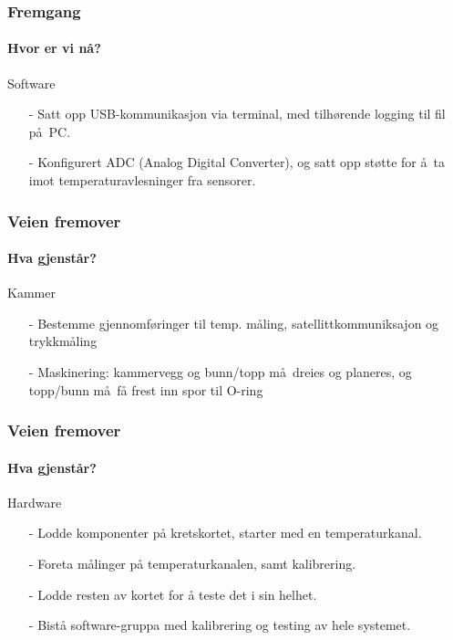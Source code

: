 \documentclass{beamer}
\begin{document}
    \begin{frame}
    	\frametitle{Fremgang}
    	\framesubtitle{Hvor er vi n\aa ?}
    	\begin{block}{Software}
    		\begin{itemize}
    			\item[-] Satt opp USB-kommunikasjon via terminal, med tilh\o rende logging til fil p\aa\ PC.
    			\item[-] Konfigurert ADC (Analog Digital Converter), og satt opp st\o tte for \aa\ ta imot temperaturavlesninger fra sensorer.
    		\end{itemize}
    	\end{block}
    \end{frame}

  \begin{frame}
    \frametitle{Veien fremover}
    \framesubtitle{Hva gjenst\aa r?}
        \begin{block}{Kammer}
    	\begin{itemize}
    		\item[-] Bestemme gjennomf\o ringer til temp. m\aa ling, satellittkommuniksajon og trykkm\aa ling
    		\item[-] Maskinering: kammervegg og bunn/topp m\aa\ dreies og planeres, og topp/bunn m\aa\ få frest inn spor til O-ring
    	\end{itemize}
    \end{block}
    \end{frame}
    
    \begin{frame}
    	\frametitle{Veien fremover}
    	\framesubtitle{Hva gjenst\aa r?}
    	\begin{block}{Hardware}
    		\begin{itemize}
    			\item[-] Lodde komponenter på kretskortet, starter med en temperaturkanal.
					\item[-] Foreta målinger på temperaturkanalen, samt kalibrering.
					\item[-] Lodde resten av kortet for å teste det i sin helhet.
					\item[-] Bistå software-gruppa med kalibrering og testing av hele systemet.
    		\end{itemize}
    	\end{block}
    \end{frame}
    
\end{document}
